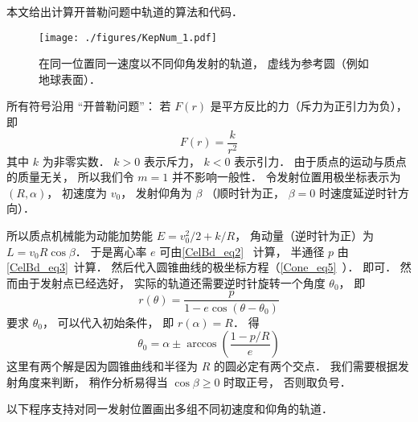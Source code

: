 
\begin{issues}
\end{issues}


本文给出计算开普勒问题中轨道的算法和代码．
\begin{figure}[ht]
\centering
\texttt{[image: ./figures/KepNum\_1.pdf]}
\caption{在同一位置同一速度以不同仰角发射的轨道， 虚线为参考圆（例如地球表面）．} \label{KepNum_fig1}
\end{figure}

所有符号沿用 “开普勒问题”： 若 $F(r)$ 是平方反比的力（斥力为正引力为负）， 即
\begin{equation}
F(r) = \frac{k}{r^2}
\end{equation}
其中 $k$ 为非零实数． $k>0$ 表示斥力， $k<0$ 表示引力． 由于质点的运动与质点的质量无关， 所以我们令 $m=1$ 并不影响一般性． 令发射位置用极坐标表示为 $(R,\alpha)$， 初速度为 $v_0$， 发射仰角为 $\beta$ （顺时针为正， $\beta=0$ 时速度延逆时针方向）．

所以质点机械能为动能加势能 $E = v_0^2/2 + k/R$， 角动量（逆时针为正）为 $L = v_0 R\cos\beta$． 于是离心率 $e$ 可由\autoref{CelBd_eq2}~ 计算， 半通径 $p$ 由\autoref{CelBd_eq3}~计算． 然后代入圆锥曲线的极坐标方程（\autoref{Cone_eq5}~）． 即可． 然而由于发射点已经选好， 实际的轨道还需要逆时针旋转一个角度 $\theta_0$， 即
\begin{equation}
r(\theta)  = \frac{p}{1 - e\cos (\theta-\theta_0)}
\end{equation}
要求 $\theta_0$， 可以代入初始条件， 即 $r(\alpha) = R$． 得
\begin{equation}
\theta_0 = \alpha \pm \arccos(\frac{1-p/R}{e})
\end{equation}
这里有两个解是因为圆锥曲线和半径为 $R$ 的圆必定有两个交点． 我们需要根据发射角度来判断， 稍作分析易得当 $\cos\beta \geqslant 0$ 时取正号， 否则取负号．

以下程序支持对同一发射位置画出多组不同初速度和仰角的轨道．

